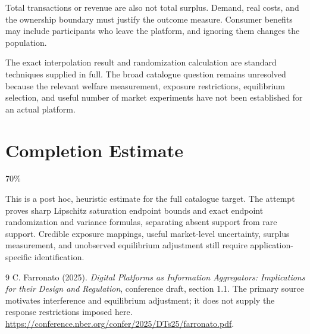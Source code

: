 \documentclass[11pt,a4paper]{article}
\begin{document}
Total transactions or revenue are also not total surplus. Demand, real costs, and the ownership boundary must justify the outcome measure. Consumer benefits may include participants who leave the platform, and ignoring them changes the population.

The exact interpolation result and randomization calculation are standard techniques supplied in full. The broad catalogue question remains unresolved because the relevant welfare measurement, exposure restrictions, equilibrium selection, and useful number of market experiments have not been established for an actual platform.

\section{Completion Estimate}
70\%

This is a post hoc, heuristic estimate for the full catalogue target.
The attempt proves sharp Lipschitz saturation endpoint bounds and exact endpoint randomization and variance formulas, separating absent support from rare support. Credible exposure mappings, useful market-level uncertainty, surplus measurement, and unobserved equilibrium adjustment still require application-specific identification.

\begin{thebibliography}{9}
 C. Farronato (2025). \emph{Digital Platforms as Information Aggregators: Implications for their Design and Regulation}, conference draft, section 1.1.
The primary source motivates interference and equilibrium adjustment; it does not supply the response restrictions imposed here.
\url{https://conference.nber.org/confer/2025/DTs25/farronato.pdf}.
\end{thebibliography}
\end{document}
